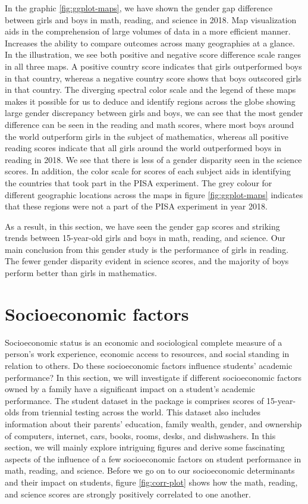 In the graphic \ref{fig:ggplot-maps}, we have shown the gender gap
difference between girls and boys in math, reading, and science in 2018.
Map visualization aids in the comprehension of large volumes of data in
a more efficient manner. Increases the ability to compare outcomes
across many geographies at a glance. In the illustration, we see both
positive and negative score difference scale ranges in all three maps. A
positive country score indicates that girls outperformed boys in that
country, whereas a negative country score shows that boys outscored
girls in that country. The diverging spectral color scale and the legend
of these maps makes it possible for us to deduce and identify regions
across the globe showing large gender discrepancy between girls and
boys, we can see that the most gender difference can be seen in the
reading and math scores, where most boys around the world outperform
girls in the subject of mathematics, whereas all positive reading scores
indicate that all girls around the world outperformed boys in reading in
2018. We see that there is less of a gender disparity seen in the
science scores. In addition, the color scale for scores of each subject
aids in identifying the countries that took part in the PISA experiment.
The grey colour for different geographic locations across the maps in
figure \ref{fig:ggplot-maps} indicates that these regions were not a
part of the PISA experiment in year 2018.

As a result, in this section, we have seen the gender gap scores and
striking trends between 15-year-old girls and boys in math, reading, and
science. Our main conclusion from this gender study is the performance
of girls in reading. The fewer gender disparity evident in science
scores, and the majority of boys perform better than girls in
mathematics.

\hypertarget{socioeconomic-factors}{%
\section{Socioeconomic factors}\label{socioeconomic-factors}}

Socioeconomic status is an economic and sociological complete measure of
a person's work experience, economic access to resources, and social
standing in relation to others. Do these socioeconomic factors influence
students' academic performance? In this section, we will investigate if
different socioeconomic factors owned by a family have a significant
impact on a student's academic performance. The student dataset in the
 package is comprises scores of 15-year-olds from
triennial testing across the world. This dataset also includes
information about their parents' education, family wealth, gender, and
ownership of computers, internet, cars, books, rooms, desks, and
dishwashers. In this section, we will mainly explore intriguing figures
and derive some fascinating aspects of the influence of a few
socioeconomic factors on student performance in math, reading, and
science. Before we go on to our socioeconomic determinants and their
impact on students, figure \ref{fig:corr-plot} shows how the math,
reading, and science scores are strongly positively correlated to one
another.

